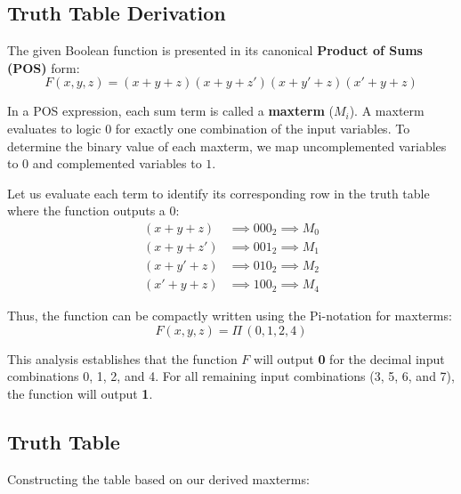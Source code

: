 \documentclass[12pt,a3paper]{article}
\begin{document}
\begin{enumerate}
\begin{tcolorbox}[enhanced,breakable,ansbox,colback=cA!4,colframe=cA,boxrule=0.8pt,arc=5pt,title={\textbf{Answer}},fonttitle=\bfseries\color{white},colbacktitle=cA]

\section*{Truth Table Derivation}

The given Boolean function is presented in its canonical \textbf{Product of Sums (POS)} form:
\[ F(x, y, z) = (x+y+z)(x+y+z')(x+y'+z)(x'+y+z) \]

In a POS expression, each sum term is called a \textbf{maxterm} ($M_i$). A maxterm evaluates to logic $0$ for exactly one combination of the input variables. To determine the binary value of each maxterm, we map uncomplemented variables to $0$ and complemented variables to $1$. 

Let us evaluate each term to identify its corresponding row in the truth table where the function outputs a $0$:
\begin{align*}
    (x + y + z)   &\implies 000_2 \implies M_0 \\
    (x + y + z')  &\implies 001_2 \implies M_1 \\
    (x + y' + z)  &\implies 010_2 \implies M_2 \\
    (x' + y + z)  &\implies 100_2 \implies M_4
\end{align*}

Thus, the function can be compactly written using the Pi-notation for maxterms:
\[ F(x, y, z) = \Pi\,(0, 1, 2, 4) \]

This analysis establishes that the function $F$ will output \textbf{0} for the decimal input combinations 0, 1, 2, and 4. For all remaining input combinations (3, 5, 6, and 7), the function will output \textbf{1}.

\vspace{0.5cm}

\subsection*{Truth Table}

Constructing the table based on our derived maxterms:


\end{tcolorbox}
\end{enumerate}
\end{document}
